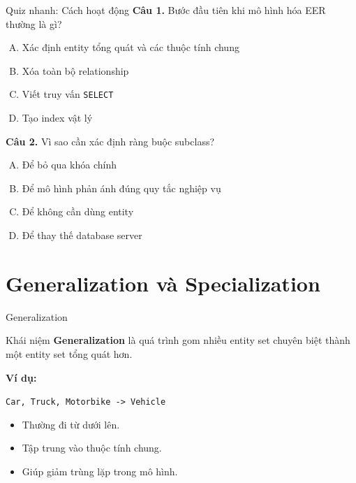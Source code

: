 \documentclass[aspectratio=169,11pt]{beamer}
\newcommand{\concept}[1]{\textcolor{NEUBlue}{\textbf{#1}}}
\newcommand{\codeword}[1]{\texttt{#1}}
\begin{document}
\begin{frame}{Quiz nhanh: Cách hoạt động}
\textbf{Câu 1.} Bước đầu tiên khi mô hình hóa EER thường là gì?
\begin{enumerate}[A.]
    \item Xác định entity tổng quát và các thuộc tính chung
    \item Xóa toàn bộ relationship
    \item Viết truy vấn \codeword{SELECT}
    \item Tạo index vật lý
\end{enumerate}
\vspace{0.2cm}
\textbf{Câu 2.} Vì sao cần xác định ràng buộc subclass?
\begin{enumerate}[A.]
    \item Để bỏ qua khóa chính
    \item Để mô hình phản ánh đúng quy tắc nghiệp vụ
    \item Để không cần dùng entity
    \item Để thay thế database server
\end{enumerate}
\end{frame}

\section{Generalization và Specialization}

\begin{frame}{Generalization}
\begin{block}{Khái niệm}
\concept{Generalization} là quá trình gom nhiều entity set chuyên biệt thành một entity set tổng quát hơn.
\end{block}

\textbf{Ví dụ:}
\begin{center}
\codeword{Car, Truck, Motorbike -> Vehicle}
\end{center}

\begin{itemize}
    \item Thường đi từ dưới lên.
    \item Tập trung vào thuộc tính chung.
    \item Giúp giảm trùng lặp trong mô hình.
\end{itemize}
\end{frame}
\end{document}
